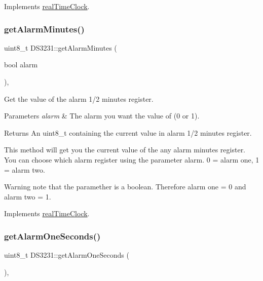 Implements \mbox{\hyperlink{classreal_time_clock_abca1ab557b357e3046d7d97eec89f750}{real\+Time\+Clock}}.

\mbox{\label{class_d_s3231_ae11a0dcc34e9c8a9b875989172339957}} 
\subsubsection{\texorpdfstring{get\+Alarm\+Minutes()}{getAlarmMinutes()}}
{\footnotesize\ttfamily uint8\+\_\+t D\+S3231\+::get\+Alarm\+Minutes (\begin{DoxyParamCaption}\item[{bool}]{alarm }\end{DoxyParamCaption})\hspace{0.3cm}{\ttfamily [override]}, {\ttfamily [virtual]}}



Get the value of the alarm 1/2 minutes register. 


\begin{DoxyParams}{Parameters}
{\em alarm} & The alarm you want the value of (0 or 1). \\
\hline
\end{DoxyParams}
\begin{DoxyReturn}{Returns}
An uint8\+\_\+t containing the current value in alarm 1/2 minutes register.
\end{DoxyReturn}
This method will get you the current value of the any alarm minutes register. You can choose which alarm register using the parameter alarm. 0 = alarm one, 1 = alarm two. \begin{DoxyWarning}{Warning}
note that the paramether is a boolean. Therefore alarm one = 0 and alarm two = 1. 
\end{DoxyWarning}


Implements \mbox{\hyperlink{classreal_time_clock_a0b3babca96f8246d4bb5e3ac2a95801d}{real\+Time\+Clock}}.

\mbox{\label{class_d_s3231_afd2b16482de8abc10981fdfca0e181a6}} 
\subsubsection{\texorpdfstring{get\+Alarm\+One\+Seconds()}{getAlarmOneSeconds()}}
{\footnotesize\ttfamily uint8\+\_\+t D\+S3231\+::get\+Alarm\+One\+Seconds (\begin{DoxyParamCaption}{ }\end{DoxyParamCaption})\hspace{0.3cm}{\ttfamily [override]}, {\ttfamily [virtual]}}




